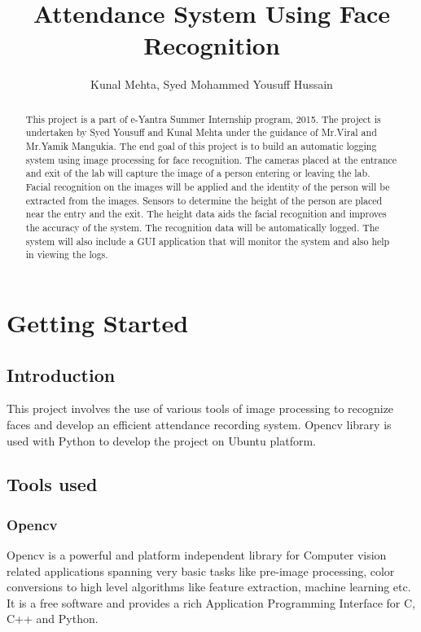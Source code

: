 \documentclass[a4paper,12pt]{article}
\title{Attendance System Using Face Recognition}
\author{Kunal Mehta, Syed Mohammed Yousuff Hussain}
\begin{document}
\tableofcontents
\maketitle

\begin{abstract}
This project is a part of e-Yantra Summer Internship program, 2015. The project is undertaken by Syed Yousuff and Kunal Mehta 
under the guidance of Mr.Viral and Mr.Yamik Mangukia. The end goal of this project is to build an automatic logging system 
using image processing for face recognition. The cameras placed at the entrance and exit of the lab will capture the image of 
a person entering or leaving the lab. Facial recognition on the images will be applied and the identity of the person will be 
extracted from the images. Sensors to determine the height of the person are placed near the entry and the exit. The height data
aids the facial recognition and improves the accuracy of the system. The recognition data will be automatically logged. The 
system will also include a GUI application that will monitor the system and also help in viewing the logs.
\end{abstract}

\newpage

\section{Getting Started}
\subsection{Introduction}
This project involves the use of various tools of image processing to recognize faces and develop an efficient attendance recording
system. Opencv library is used with Python to develop the project on Ubuntu platform. 

\subsection{Tools used}

 \subsubsection*{Opencv}
 Opencv is a powerful and platform independent library for Computer vision related applications spanning very basic tasks like pre-image 
 processing, color conversions to high level algorithms like feature extraction, machine learning etc. It is a free software and provides
 a rich Application Programming Interface for C, C++ and Python.
\end{document}
